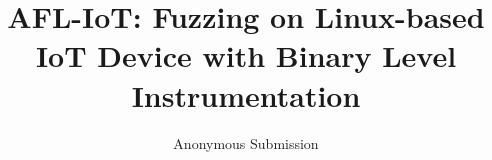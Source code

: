 \documentclass[10pt, conference, letterpaper]{IEEEtran}
\newcommand{\sysname}{AFL-IoT\xspace}
\begin{document}
\date{}

\title{\Large \bf  \sysname : Fuzzing on Linux-based IoT Device with Binary Level Instrumentation}

\author{Anonymous Submission}




\maketitle

\thispagestyle{empty}
\pagestyle{plain}














\end{document}
